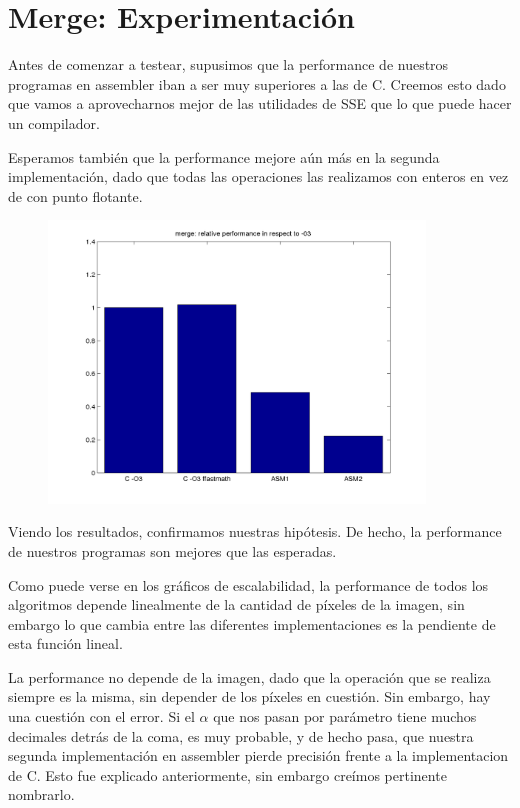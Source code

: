 \section*{Merge: Experimentación}

Antes de comenzar a testear, supusimos que la performance de nuestros programas en assembler iban a ser muy superiores a las de C. Creemos esto dado que vamos a aprovecharnos mejor de las utilidades de SSE que lo que puede hacer un compilador. 

Esperamos también que la performance mejore aún más en la segunda implementación, dado que todas las operaciones las realizamos con enteros en vez de con punto flotante.


\begin{figure}[!hbt] 
  \includegraphics[width=10cm]{merge-random-uniform-pixel-fixed-size_barchart.png}
	\centering
\end{figure}



Viendo los resultados, confirmamos nuestras hipótesis. De hecho, la performance de nuestros programas son mejores que las esperadas.

Como puede verse en los gráficos de escalabilidad, la performance de todos los algoritmos depende linealmente de la cantidad de píxeles de la imagen, sin embargo lo que cambia entre las diferentes implementaciones es la pendiente de esta función lineal.

La performance no depende de la imagen, dado que la operación que se realiza siempre es la misma, sin depender de los píxeles en cuestión.
Sin embargo, hay una cuestión con el error. Si el $\alpha$ que nos pasan por parámetro tiene muchos decimales detrás de la coma, es muy probable, y de hecho pasa, que nuestra segunda implementación en assembler pierde precisión frente a la implementacion de C. Esto fue explicado anteriormente, sin embargo creímos pertinente nombrarlo.

